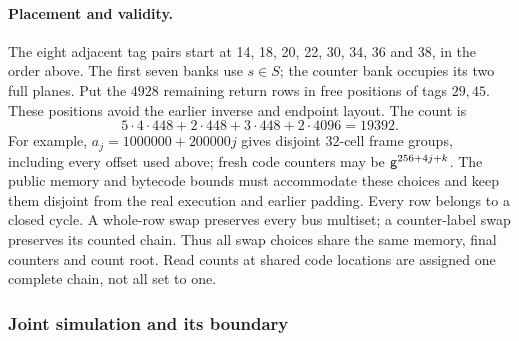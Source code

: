 \paragraph{Placement and validity.} The eight adjacent tag pairs start at 14, 18, 20, 22, 30, 34, 36 and 38, in the order above. The first seven banks use $s\in S$; the counter bank occupies its two full planes. Put the $4928$ remaining return rows in free positions of tags $29,45$. These positions avoid the earlier inverse and endpoint layout. The count is
\[
 5\cdot4\cdot448+2\cdot448+3\cdot448+2\cdot4096=19392.
\]
For example, $a_j=1000000+200000j$ gives disjoint $32$-cell frame groups, including every offset used above; fresh code counters may be $\mathsf{g}^{256+4j+k}$. The public memory and bytecode bounds must accommodate these choices and keep them disjoint from the real execution and earlier padding. Every row belongs to a closed cycle. A whole-row swap preserves every bus multiset; a counter-label swap preserves its counted chain. Thus all swap choices share the same memory, final counters and count root. Read counts at shared code locations are assigned one complete chain, not all set to one.

\subsubsection{Joint simulation and its boundary}

